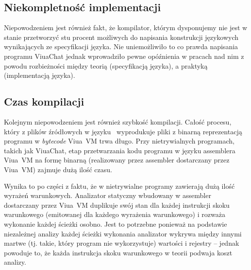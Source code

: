 \subsection{Niekompletność implementacji}

Niepowodzeniem jest również fakt, że kompilator, którym dysponujemy nie jest w
stanie przetworzyć stu procent możliwych do napisania konstrukcji językowych
wynikających ze specyfikacji języka. Nie uniemożliwiło to co prawda napisania
programu ViuaChat jednak wprowadziło pewne opóźnienia w pracach nad nim z powodu
rozbieżności między teorią (specyfikacją języka), a praktyką (implementacją
języka).

\subsection{Czas kompilacji}

Kolejnym niepowodzeniem jest również szybkość kompilacji. Całość procesu, który
z plików źródłowych w języku \ViuAct\ wyprodukuje pliki z binarną reprezentacją
programu w \emph{bytecode} Viua~VM trwa długo. Przy nietrywialnych programach,
takich jak ViuaChat, etap przetwarzania kodu programu w języku assemblera
Viua~VM na formę binarną (realizowany przez assembler dostarczany przez Viua~VM)
zajmuje dużą ilość czasu.

Wynika to po części z faktu, że w nietrywialne programy zawierają dużą ilość
wyrażeń warunkowych. Analizator statyczny wbudowany w assembler dostarczany
przez Viua~VM duplikuje swój stan dla każdej instrukcji skoku warunkowego
(emitowanej dla każdego wyrażenia warunkowego) i rozważa wykonanie każdej
ścieżki osobno.
Jest to potrzebne ponieważ na podstawie niezależnej analizy każdej ścieżki
wykonania analizator wykrywa między innymi martwe (tj. takie, który program nie
wykorzystuje) wartości i rejestry -- jednak powoduje to, że każda instrukcja
skoku warunkowego w teorii podwaja koszt analizy.


